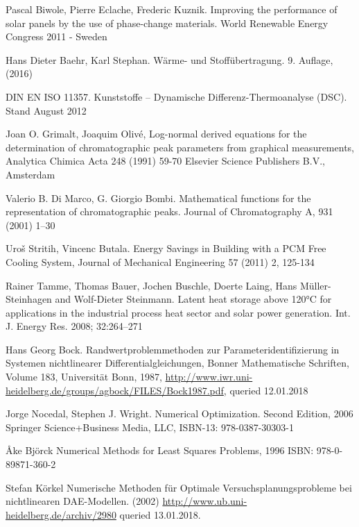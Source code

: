 \documentclass{scrartcl}[12pt, halfparskip]
\numberwithin{equation}{section}
\numberwithin{figure}{section}
\numberwithin{table}{section}
\begin{document}
\begin{thebibliography}{9}
	
	Pascal Biwole, Pierre Eclache, Frederic Kuznik.
	Improving the performance of solar panels by the use of phase-change materials.
	World Renewable Energy Congress 2011 - Sweden
	
	Hans Dieter Baehr, Karl Stephan.
	Wärme- und Stoffübertragung.
	9. Auflage, (2016)
	
	DIN EN ISO 11357.
	Kunststoffe – Dynamische Differenz-Thermoanalyse (DSC).
	Stand August 2012
	
	Joan O. Grimalt, Joaquim Olivé,
	Log-normal derived equations for the determination
	of chromatographic peak parameters
	from graphical measurements,
	Analytica Chimica Acta 248 (1991) 59-70
	Elsevier Science Publishers B.V., Amsterdam
	
	Valerio B. Di Marco, G. Giorgio Bombi.
	Mathematical functions for the representation of chromatographic
	peaks.
	Journal of Chromatography A, 931 (2001) 1–30
	
	Uroš Stritih, Vincenc Butala.
	Energy Savings in Building with a PCM Free Cooling System,
	Journal of Mechanical Engineering 57 (2011) 2, 125-134	
	
	Rainer Tamme, Thomas Bauer, Jochen Buschle, Doerte Laing, Hans Müller-Steinhagen and Wolf-Dieter Steinmann.
	Latent heat storage above 120°C for applications in the industrial process heat sector and solar power generation.
	Int. J. Energy Res. 2008; 32:264–271
	
	Hans Georg Bock.
	Randwertproblemmethoden zur Parameteridentifizierung in Systemen nichtlinearer Differentialgleichungen,
	Bonner Mathematische Schriften, Volume 183, Universität Bonn, 1987,
	\url{http://www.iwr.uni-heidelberg.de/groups/agbock/FILES/Bock1987.pdf}, queried 12.01.2018
	
	Jorge Nocedal, Stephen J. Wright.
	Numerical Optimization.
	Second Edition, 2006 Springer Science+Business Media, LLC, ISBN-13: 978-0387-30303-1
	
	Åke Björck
	Numerical Methods for Least Squares Problems, 1996
	ISBN: 978-0-89871-360-2
	
	Stefan Körkel
	Numerische Methoden für Optimale Versuchsplanungsprobleme bei nichtlinearen DAE-Modellen. (2002)
	\url{http://www.ub.uni-heidelberg.de/archiv/2980} queried 13.01.2018.
	

\end{thebibliography}
\end{document}
